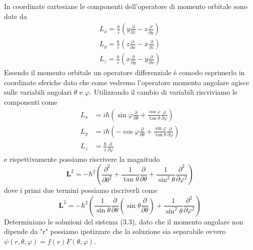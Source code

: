 In coordinate cartesiane le componenti dell'operatore di momento orbitale sono date da 
\begin{equation*}
	\begin{aligned}
		L_x = \frac{\hbar}{i} \left ( y\frac{\partial}{\partial z} - z \frac{\partial}{\partial y}\right ) \\[0.3cm]
		L_y = \frac{\hbar}{i} \left ( z \frac{\partial}{\partial x}- x \frac{\partial}{\partial z}\right )\\[0.3cm]
		L_z =  \frac{\hbar}{i} \left ( x \frac{\partial}{\partial y} - y \frac{\partial}{\partial x}\right )
	\end{aligned}
\end{equation*}
Essendo il momento orbitale un operatore differenziale \`e comodo esprimerlo in coordinate sferiche dato che come vedremo l'operatore momento angolare agisce sulle variabili angolari $\theta$ e $\varphi$. Utilizzando il cambio di variabili riscriviamo le componenti come
\begin{equation*}
	\begin{aligned}
L_x & =i \hbar\left(\sin \varphi \frac{\partial}{\partial \theta}+\frac{\cos \varphi}{\tan \theta} \frac{\partial}{\partial \varphi}\right) \\
L_y & =i \hbar\left(-\cos \varphi \frac{\partial}{\partial \theta}+\frac{\sin \varphi}{\tan \theta} \frac{\partial}{\partial \varphi}\right) \\
L_z & =\frac{\hbar}{i} \frac{\partial}{\partial \varphi}
\end{aligned}
\end{equation*}
e rispettivamente possiamo riscrivere la magnitudo 
\begin{equation*}
	\mathbf{L}^2=-\hbar^2\left(\frac{\partial^2}{\partial \theta^2}+\frac{1}{\tan \theta} \frac{\partial}{\partial \theta}+\frac{1}{\sin ^2 \theta} \frac{\partial^2}{\partial \varphi^2}\right)
\end{equation*}
dove i primi due termini possiamo riscriverli come 
\begin{equation*}
	\mathbf{L}^2=-\hbar^2\left(\frac{1}{\sin\theta}\frac{\partial}{\partial \theta} \left ( \sin \theta \frac{\partial}{\partial \theta} \right)+\frac{1}{\sin ^2 \theta} \frac{\partial^2}{\partial \varphi^2}\right)
\end{equation*}
Determiniano le soluzioni del sistema (3.3), dato che il momento angolare non dipende da "r" possiamo ipotizzare che la soluzione sia separabile ovvero $\psi(r,\theta,\varphi) = f(r)F(\theta, \varphi)$.
\\
